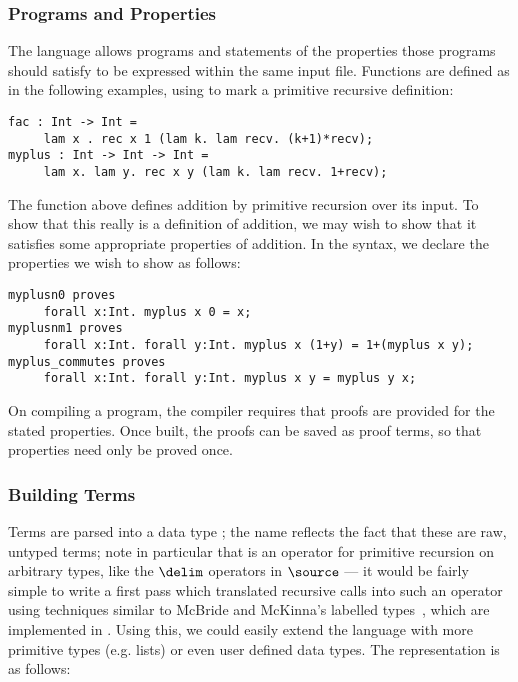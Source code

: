 \subsubsection{Programs and Properties}

The \Funl{} language allows programs and statements of the properties
those programs should satisfy to be expressed within the same input file.
Functions are defined as in the following examples, using 
to mark a primitive recursive definition:

\begin{verbatim}
fac : Int -> Int =
     lam x . rec x 1 (lam k. lam recv. (k+1)*recv);
myplus : Int -> Int -> Int =
     lam x. lam y. rec x y (lam k. lam recv. 1+recv);
\end{verbatim}

The  function above defines addition by primitive
recursion over its input. To show that this really is a definition of
addition, we may wish to show that it satisfies some appropriate
properties of addition. In the \Funl{} syntax, we declare the
properties we wish to show as follows:

\begin{verbatim}
myplusn0 proves
     forall x:Int. myplus x 0 = x;
myplusnm1 proves
     forall x:Int. forall y:Int. myplus x (1+y) = 1+(myplus x y);
myplus_commutes proves
     forall x:Int. forall y:Int. myplus x y = myplus y x;
\end{verbatim}

On compiling a program, the compiler requires that proofs are provided
for the stated properties. Once built, the proofs can be saved as
proof terms, so that properties need only be proved once.

\subsubsection{Building Terms}
Terms are parsed into a data type ; the name
 reflects the fact that these are raw, untyped terms; note
in particular that  is an operator for primitive recursion
on arbitrary types, like the $\delim$ operators in $\source$ --- it
would be fairly simple to write a first pass which translated
recursive calls into such an operator using techniques similar to
McBride and McKinna's labelled types~\cite{view-left}, which are
implemented in \Ivor{}. Using this, we could easily extend the
language with more primitive types (e.g. lists) or even user defined
data types. The representation is as follows:

